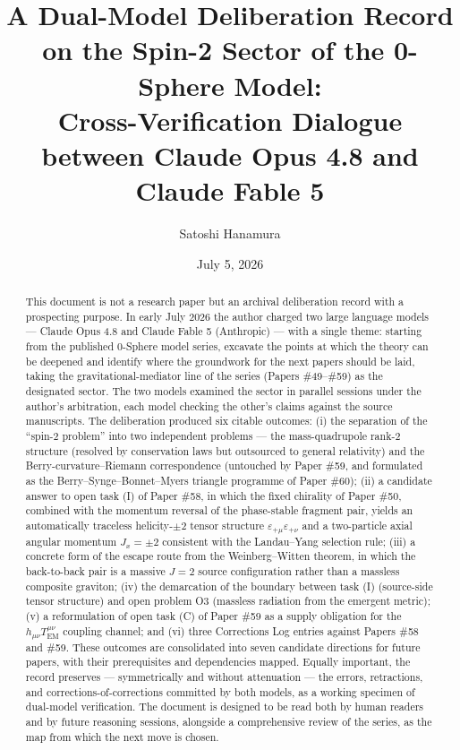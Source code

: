 \documentclass[%
 reprint, amsmath,amssymb, aps, prb, ]{revtex4-2}
\numberwithin{equation}{section}
\begin{document}
\title{A Dual-Model Deliberation Record on the Spin-2 Sector of the 0-Sphere Model:\\ Cross-Verification Dialogue between Claude Opus 4.8 and Claude Fable 5}

\author{Satoshi Hanamura}
\date{July 5, 2026}

\begin{abstract}
This document is not a research paper but an archival deliberation record with a prospecting purpose.
In early July 2026 the author charged two large language models --- Claude Opus 4.8 and Claude Fable 5 (Anthropic) --- with a single theme: starting from the published 0-Sphere model series, excavate the points at which the theory can be deepened and identify where the groundwork for the next papers should be laid, taking the gravitational-mediator line of the series (Papers \#49--\#59) as the designated sector.
The two models examined the sector in parallel sessions under the author's arbitration, each model checking the other's claims against the source manuscripts.
The deliberation produced six citable outcomes: (i) the separation of the ``spin-2 problem'' into two independent problems --- the mass-quadrupole rank-2 structure (resolved by conservation laws but outsourced to general relativity) and the Berry-curvature--Riemann correspondence (untouched by Paper \#59, and formulated as the Berry--Synge--Bonnet--Myers triangle programme of Paper \#60); (ii) a candidate answer to open task (I) of Paper \#58, in which the fixed chirality of Paper \#50, combined with the momentum reversal of the phase-stable fragment pair, yields an automatically traceless helicity-$\pm 2$ tensor structure $\varepsilon_{+\mu}\varepsilon_{+\nu}$ and a two-particle axial angular momentum $J_x=\pm2$ consistent with the Landau--Yang selection rule; (iii) a concrete form of the escape route from the Weinberg--Witten theorem, in which the back-to-back pair is a massive $J=2$ source configuration rather than a massless composite graviton; (iv) the demarcation of the boundary between task (I) (source-side tensor structure) and open problem O3 (massless radiation from the emergent metric); (v) a reformulation of open task (C) of Paper \#59 as a supply obligation for the $h_{\mu\nu}T^{\mu\nu}_{\mathrm{EM}}$ coupling channel; and (vi) three Corrections Log entries against Papers \#58 and \#59.
These outcomes are consolidated into seven candidate directions for future papers, with their prerequisites and dependencies mapped.
Equally important, the record preserves --- symmetrically and without attenuation --- the errors, retractions, and corrections-of-corrections committed by both models, as a working specimen of dual-model verification.
The document is designed to be read both by human readers and by future reasoning sessions, alongside a comprehensive review of the series, as the map from which the next move is chosen.
\end{abstract}
\end{document}
